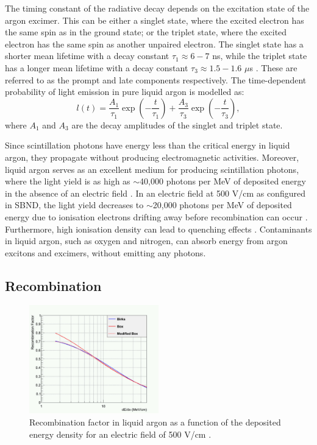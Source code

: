 The timing constant of the radiative decay depends on the excitation state of the argon excimer.
This can be either a singlet state, where the excited electron has the same spin as in the ground state; or the triplet state, where the excited electron has the same spin as another unpaired electron.
The singlet state has a shorter mean lifetime with a decay constant $\tau_{1} \approx 6 - 7$ ns, while the triplet state has a longer mean lifetime with a decay constant $\tau_{3} \approx 1.5 - 1.6$ 
$\mu$s \cite{photon_lifetime}.
These are referred to as the prompt and late components respectively. 
The time-dependent probability of light emission in pure liquid argon is modelled as:
\begin{equation}
        l(t)=\frac{A_{1}}{\tau_{1}}\exp{\left(-\frac{t}{\tau_{1}}\right)} +\frac{A_{3}}{\tau_{3}}\exp{\left(-\frac{t}{\tau_{3}}\right)},
\end{equation}
where $A_{1}$ and $A_{3}$ are the decay amplitudes of the singlet and triplet state.

Since scintillation photons have energy less than the critical energy in liquid argon, they propagate without producing electromagnetic activities. 
Moreover, liquid argon serves as an excellent medium for producing scintillation photons, where the light yield is as high as $\sim$40,000 photons per MeV of deposited energy in the absence of an electric field \cite{light_yield}.
In an electric field at 500 V/cm as configured in SBND, the light yield decreases to $\sim$20,000 photons per MeV of deposited energy due to ionisation electrons drifting away before recombination can occur \cite{light_yield_Efield}.
Furthermore, high ionisation density can lead to quenching effects \cite{Lariat}.
Contaminants in liquid argon, such as oxygen and nitrogen, can absorb energy from argon excitons and excimers, without emitting any photons.
 
\subsection{Recombination}
\label{sec:recomb}

\begin{figure}[b!] 
\centering    
\includegraphics[width=0.5\textwidth]{recomb_graph}
\caption[Reombination Factor in Liquid Argon]{
Recombination factor in liquid argon as a function of the deposited energy density for an electric field of 500 V/cm \cite{argoneut_recomb}.
}
\label{fig:recomb_graph}
\end{figure}

